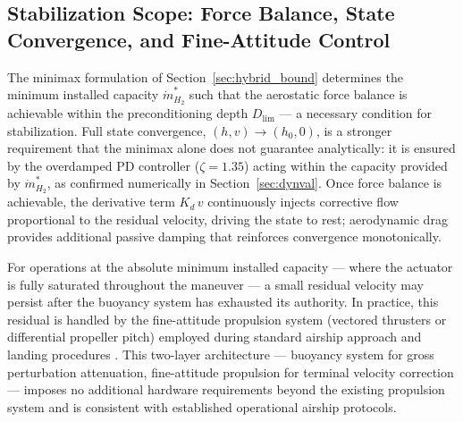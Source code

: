 \documentclass[applsci,article,submit,pdftex,moreauthors]{Definitions/mdpi}
\newcommand{\dotmstar}{\dot{m}_{H_2}^{*}}
\newcommand{\added}[1]{#1}
\begin{document}
\subsection{Stabilization Scope: Force Balance, State Convergence, and Fine-Attitude Control}
\label{sec:stab_scope}
\added{The minimax formulation of Section~\ref{sec:hybrid_bound} determines the minimum installed capacity $\dotmstar$ such that the aerostatic force balance is achievable within the preconditioning depth $D_\text{lim}$ --- a necessary condition for stabilization. Full state convergence, $(h, v) \to (h_0, 0)$, is a stronger requirement that the minimax alone does not guarantee analytically: it is ensured by the overdamped PD controller ($\zeta = 1.35$) acting within the capacity provided by $\dotmstar$, as confirmed numerically in Section~\ref{sec:dynval}. Once force balance is achievable, the derivative term $K_d\,v$ continuously injects corrective flow proportional to the residual velocity, driving the state to rest; aerodynamic drag provides additional passive damping that reinforces convergence monotonically.}

\added{For operations at the absolute minimum installed capacity --- where the actuator is fully saturated throughout the maneuver --- a small residual velocity may persist after the buoyancy system has exhausted its authority. In practice, this residual is handled by the fine-attitude propulsion system (vectored thrusters or differential propeller pitch) employed during standard airship approach and landing procedures \cite{ref7, ref8}. This two-layer architecture --- buoyancy system for gross perturbation attenuation, fine-attitude propulsion for terminal velocity correction --- imposes no additional hardware requirements beyond the existing propulsion system and is consistent with established operational airship protocols.}
\end{document}
